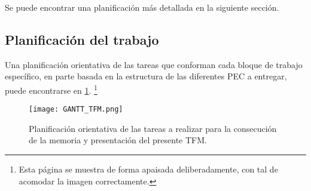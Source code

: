 \documentclass[IB,BIB]{TFUOC}%
\begin{document}
Se puede encontrar una planificación más detallada en la siguiente sección.


\newpage
\begin{landscape}

\section{Planificación del trabajo}



Una planificación orientativa de las tareas que conforman cada bloque de trabajo específico, en parte basada en la estructura de las diferentes PEC a entregar, puede encontrarse en \ref{fig:GANTT_TFM}. \footnote{Esta página se muestra de forma apaisada deliberadamente, con tal de acomodar la imagen correctamente.}

\begin{figure}[!htbp]
    \centering
    \texttt{[image: GANTT\_TFM.png]}
    \caption{Planificación orientativa de las tareas a realizar para la consecución de la memoria y presentación del presente TFM.}
    \label{fig:GANTT_TFM}
\end{figure}


\newpage
\end{landscape}
\end{document}
